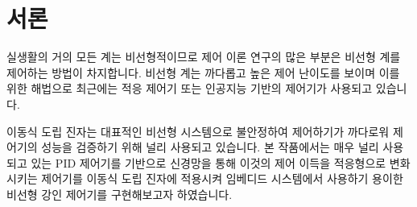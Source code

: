 \section{서론}

실생활의 거의 모든 계는 비선형적이므로 제어 이론 연구의 많은 부분은 비선형 계를 제어하는 방법이 차지합니다. 비선형 계는 까다롭고 높은 제어 난이도를 보이며 이를 위한 해법으로 최근에는 적응 제어기 또는 인공지능 기반의 제어기가 사용되고 있습니다. 

이동식 도립 진자는 대표적인 비선형 시스템으로 불안정하여 제어하기가 까다로워 제어기의 성능을 검증하기 위해 널리 사용되고 있습니다. 본 작품에서는 매우 널리 사용되고 있는 PID 제어기를 기반으로 신경망을 통해 이것의 제어 이득을 적응형으로 변화시키는 제어기를 이동식 도립 진자에 적용시켜 임베디드 시스템에서 사용하기 용이한 비선형 강인 제어기를 구현해보고자 하였습니다. 
